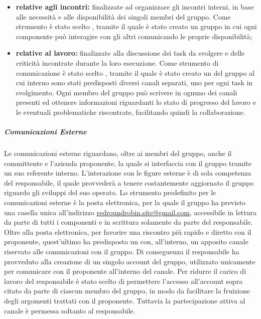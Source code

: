 				\begin{itemize}
					\item \textbf{relative agli incontri:} finalizzate ad organizzare gli incontri interni, in base alle necessità e alle disponibilità dei singoli membri del gruppo.
					\newline
					Come strumento è stato scelto , tramite il quale è stato creato un gruppo in cui ogni componente può interagire con gli altri comunicando le proprie disponibilità;
					\item \textbf{relative al lavoro:} finalizzate alla discussione dei task da svolgere e delle criticità incontrate durante la loro esecuzione.
					\newline
					Come strumento di comunicazione è stato scelto , tramite il quale è stato creato un  del gruppo al cui interno sono stati predisposti diversi canali separati, uno per ogni task in svolgimento. Ogni membro del gruppo può scrivere in ognuno dei canali presenti ed ottenere informazioni riguardanti lo stato di progresso del lavoro e le eventuali problematiche riscontrate, facilitando quindi la collaborazione.
				\end{itemize}
			
			\subparagraph{Comunicazioni Esterne}
			
				Le comunicazioni esterne riguardano, oltre ai membri del gruppo, anche il committente e l'azienda proponente, la quale si interfaccia con il gruppo tramite un suo referente interno. L'interazione con le figure esterne è di sola competenza del responsabile, il quale provvederà a tenere costantemente aggiornato il gruppo riguardo gli sviluppi del suo operato.
				\newline
				Lo strumento predefinito per le comunicazioni esterne è la posta elettronica, per la quale il gruppo ha previsto una casella unica all'indirizzo \href{mailto:redroundrobin.site@gmail.com}{redroundrobin.site@gmail.com}, accessibile in lettura da parte di tutti i componenti e in scrittura solamente da parte del responsabile.
				\newline
				Oltre alla posta elettronica, per favorire una riscontro più rapido e diretto con il proponente, quest'ultimo ha predisposto un   con, all'interno, un apposito canale riservato alle comunicazioni con il gruppo. Di conseguenza il responsabile ha provveduto alla creazione di un singolo account  del gruppo, utilizzato unicamente per comunicare con il proponente all'interno del canale. Per ridurre il carico di lavoro del responsabile è stato scelto di permettere l'accesso all'account sopra citato da parte di ciascun membro del gruppo, in modo da facilitare la fruizione degli argomenti trattati con il proponente. Tuttavia la partecipazione attiva al canale è permessa soltanto al responsabile.
						

